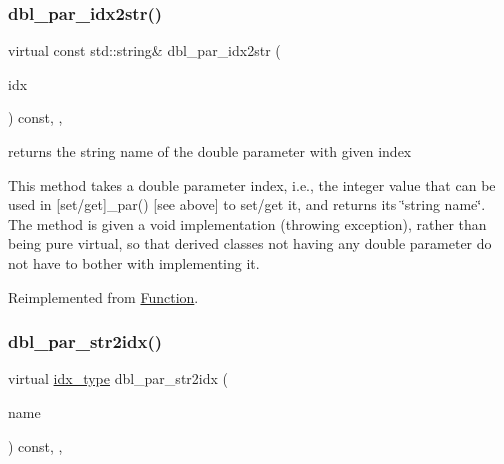 \subsubsection{\texorpdfstring{dbl\+\_\+par\+\_\+idx2str()}{dbl\_par\_idx2str()}}
{\footnotesize\ttfamily virtual const std\+::string\& dbl\+\_\+par\+\_\+idx2str (\begin{DoxyParamCaption}\item[{const \mbox{\hyperlink{class_s_m_spp__di__unipi__it_1_1_thin_compute_interface_aa3d710629ad8c434286726ad810c3b47}{idx\+\_\+type}}}]{idx }\end{DoxyParamCaption}) const\hspace{0.3cm}{\ttfamily [inline]}, {\ttfamily [override]}, {\ttfamily [virtual]}}



returns the string name of the double parameter with given index 

This method takes a double parameter index, i.\+e., the integer value that can be used in \mbox{[}set/get\mbox{]}\+\_\+par() \mbox{[}see above\mbox{]} to set/get it, and returns its \char`\"{}string name\char`\"{}. The method is given a void implementation (throwing exception), rather than being pure virtual, so that derived classes not having any double parameter do not have to bother with implementing it. 

Reimplemented from \mbox{\hyperlink{class_s_m_spp__di__unipi__it_1_1_function_a93f1297e7910e91cc18b303376191026}{Function}}.

\mbox{\label{class_s_m_spp__di__unipi__it_1_1_c05_function_a6d353ac3d1200d9bea89235da61bc4f3}} 
\subsubsection{\texorpdfstring{dbl\+\_\+par\+\_\+str2idx()}{dbl\_par\_str2idx()}}
{\footnotesize\ttfamily virtual \mbox{\hyperlink{class_s_m_spp__di__unipi__it_1_1_thin_compute_interface_aa3d710629ad8c434286726ad810c3b47}{idx\+\_\+type}} dbl\+\_\+par\+\_\+str2idx (\begin{DoxyParamCaption}\item[{const std\+::string \&}]{name }\end{DoxyParamCaption}) const\hspace{0.3cm}{\ttfamily [inline]}, {\ttfamily [override]}, {\ttfamily [virtual]}}



